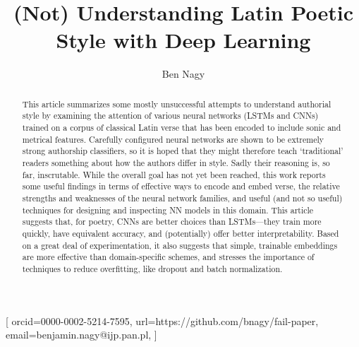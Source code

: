 \documentclass[
    twocolumn,
    hf,
]{ceurart}
\begin{document}

\conference{}
\title{(Not) Understanding Latin Poetic Style with Deep Learning}


\author[1]{Ben Nagy}[%
    orcid=0000-0002-5214-7595,
    url=https://github.com/bnagy/fail-paper,
    email=benjamin.nagy@ijp.pan.pl,
]
\address[1]{Institute of Polish Language, Polish Academy of Sciences (IJP PAN)\\
    Adama Mickiewicz 31\\
    Kraków, Poland}
\begin{abstract}
    This article summarizes some mostly unsuccessful attempts to understand
    authorial style by examining the attention of various neural networks (LSTMs
    and CNNs) trained on a corpus of classical Latin verse that has been encoded
    to include sonic and metrical features. Carefully configured neural networks
    are shown to be extremely strong authorship classifiers, so it is hoped that
    they might therefore teach `traditional' readers something about how the
    authors differ in style. Sadly their reasoning is, so far, inscrutable.
    While the overall goal has not yet been reached, this work reports some
    useful findings in terms of effective ways to encode and embed verse, the
    relative strengths and weaknesses of the neural network families, and useful
    (and not so useful) techniques for designing and inspecting NN models in
    this domain. This article suggests that, for poetry, CNNs are better choices
    than LSTMs---they train more quickly, have equivalent accuracy, and
    (potentially) offer better interpretability. Based on a great deal of
    experimentation, it also suggests that simple, trainable embeddings are more
    effective than domain-specific schemes, and stresses the importance of
    techniques to reduce overfitting, like dropout and batch normalization.
\end{abstract}
\end{document}
